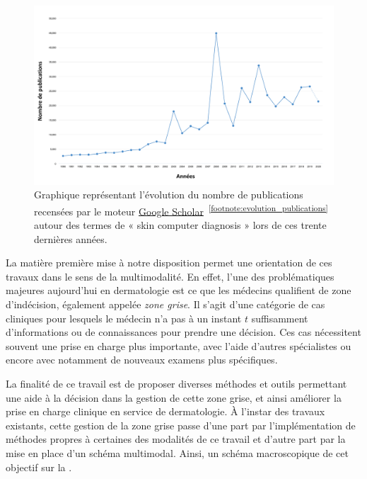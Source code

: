 \begin{figure}[H]
    \centering
    \includegraphics[width=\linewidth]{contents/i_introduction/resources/evolution_publications.pdf}
    \caption{Graphique représentant l'évolution du nombre de publications recensées par le moteur \href{https://scholar.google.fr/}{Google Scholar}~\textsuperscript{\ref{footnote:evolution_publications}} autour des termes de « skin computer diagnosis » lors de ces trente dernières années.}
    \label{fig:evolution_publications}
\end{figure}\par
\addtocounter{footnote}{1}

La matière première mise à notre disposition permet une orientation de ces travaux dans le sens de la multimodalité. En effet, l'une des problématiques majeures aujourd'hui en dermatologie est ce que les médecins qualifient de zone d'indécision, également appelée \textit{zone grise}. Il s'agit d'une catégorie de cas cliniques pour lesquels le médecin n'a pas à un instant $t$ suffisamment d'informations ou de connaissances pour prendre une décision. Ces cas nécessitent souvent une prise en charge plus importante, avec l'aide d'autres spécialistes ou encore avec notamment de nouveaux examens plus spécifiques.\par

La finalité de ce travail est de proposer diverses méthodes et outils permettant une aide à la décision dans la gestion de cette zone grise, et ainsi améliorer la prise en charge clinique en service de dermatologie. À l'instar des travaux existants, cette gestion de la zone grise passe d'une part par l'implémentation de méthodes propres à certaines des modalités de ce travail et d'autre part par la mise en place d'un schéma multimodal. Ainsi, un schéma macroscopique de cet objectif sur la .\par
\clearpage

